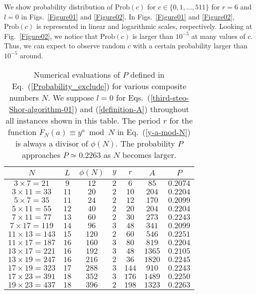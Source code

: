 \documentclass[12pt]{article}
\begin{document}
We show probability distribution of
$\mbox{Prob}(c)$ for $c\in\{0,1,...,511\}$
for $r=6$ and $l=0$
in Figs.~\ref{Figure01} and \ref{Figure02}.
In Figs.~\ref{Figure01} and \ref{Figure02},
$\mbox{Prob}(c)$ is represented in linear and logarithmic scales, respectively.
Looking at Fig.~\ref{Figure02},
we notice that $\mbox{Prob}(c)$ is larger than $10^{-5}$ at many values of $c$.
Thus,
we can expect to observe random $c$ with a certain probability larger than $10^{-5}$ around.

\begin{table}
\caption{Numerical evaluations of $P$ defined in Eq.~(\ref{Probability_exclude}) for various composite numbers $N$.
We suppose $l=0$ for Eqs.~(\ref{third-steo-Shor-algorithm-01}) and (\ref{definition-A}) throughout all instances shown in this table.
The period $r$ for the function
$F_{N}(a)\equiv y^{a} \bmod N$ in Eq.~(\ref{y-a-mod-N})
is always a divisor of $\phi(N)$.
The probability $P$ approaches $P\simeq 0.2263$ as $N$ becomes larger.}
\label{Table01}
\begin{center}
\begin{tabular}{|c|c|c|c|c|c|c|}
\hline
$N$ & $L$ & $\phi(N)$ & $y$ & $r$ & $A$ & $P$ \\
\hline
$3\times 7=21$ & $9$ & $12$ & $2$ & $6$ & $85$ & $0.2074$ \\
%
$3\times 11=33$ & $11$ & $20$ & $2$ & $10$ & $204$ & $0.2204$ \\
%
$5\times 7=35$ & $11$ & $24$ & $2$ & $12$ & $170$ & $0.2099$ \\
%
$5\times 11=55$ & $12$ & $40$ & $2$ & $20$ & $204$ & $0.2204$ \\
%
$7\times 11=77$ & $13$ & $60$ & $2$ & $30$ & $273$ & $0.2243$ \\
%
$7\times 17=119$ & $14$ & $96$ & $3$ & $48$ & $341$ & $0.2099$ \\
%
$11\times 13=143$ & $15$ & $120$ & $2$ & $60$ & $546$ & $0.2251$ \\
%
$11\times 17=187$ & $16$ & $160$ & $3$ & $80$ & $819$ & $0.2204$ \\
%
$13\times 17=221$ & $16$ & $192$ & $3$ & $48$ & $1365$ & $0.2105$ \\
%
$13\times 19=247$ & $16$ & $216$ & $2$ & $36$ & $1820$ & $0.2245$ \\
%
$17\times 19=323$ & $17$ & $288$ & $3$ & $144$ & $910$ & $0.2243$ \\
%
$17\times 23=391$ & $18$ & $352$ & $3$ & $176$ & $1489$ & $0.2250$ \\
%
$19\times 23=437$ & $18$ & $396$ & $2$ & $198$ & $1323$ & $0.2263$ \\

\end{tabular}
\end{center}
\end{table}
\end{document}
